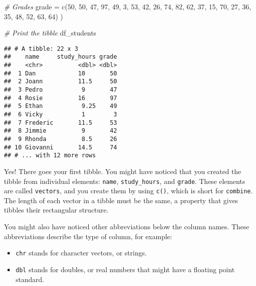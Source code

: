 \documentclass[
]{article}
\newenvironment{Shaded}{\begin{snugshade}}{\end{snugshade}}
\newcommand{\AttributeTok}[1]{\textcolor[rgb]{0.77,0.63,0.00}{#1}}
\newcommand{\CommentTok}[1]{\textcolor[rgb]{0.56,0.35,0.01}{\textit{#1}}}
\newcommand{\DecValTok}[1]{\textcolor[rgb]{0.00,0.00,0.81}{#1}}
\newcommand{\FunctionTok}[1]{\textcolor[rgb]{0.00,0.00,0.00}{#1}}
\newcommand{\NormalTok}[1]{#1}
\begin{document}
\begin{Shaded}
\begin{Highlighting}[]
  \CommentTok{\# Grades}
  \AttributeTok{grade =} \FunctionTok{c}\NormalTok{(}\DecValTok{50}\NormalTok{, }\DecValTok{50}\NormalTok{, }\DecValTok{47}\NormalTok{, }\DecValTok{97}\NormalTok{, }\DecValTok{49}\NormalTok{, }\DecValTok{3}\NormalTok{, }\DecValTok{53}\NormalTok{, }\DecValTok{42}\NormalTok{, }\DecValTok{26}\NormalTok{,}
             \DecValTok{74}\NormalTok{, }\DecValTok{82}\NormalTok{, }\DecValTok{62}\NormalTok{, }\DecValTok{37}\NormalTok{, }\DecValTok{15}\NormalTok{, }\DecValTok{70}\NormalTok{, }\DecValTok{27}\NormalTok{, }\DecValTok{36}\NormalTok{, }\DecValTok{35}\NormalTok{,}
             \DecValTok{48}\NormalTok{, }\DecValTok{52}\NormalTok{, }\DecValTok{63}\NormalTok{, }\DecValTok{64}\NormalTok{)}
\NormalTok{)}

\CommentTok{\# Print the tibble}
\NormalTok{df\_students}
\end{Highlighting}
\end{Shaded}

\begin{verbatim}
## # A tibble: 22 x 3
##    name     study_hours grade
##    <chr>          <dbl> <dbl>
##  1 Dan            10       50
##  2 Joann          11.5     50
##  3 Pedro           9       47
##  4 Rosie          16       97
##  5 Ethan           9.25    49
##  6 Vicky           1        3
##  7 Frederic       11.5     53
##  8 Jimmie          9       42
##  9 Rhonda          8.5     26
## 10 Giovanni       14.5     74
## # ... with 12 more rows
\end{verbatim}

Yes! There goes your first tibble. You might have noticed that you
created the tibble from individual elements: \texttt{name},
\texttt{study\_hours}, and \texttt{grade}. These elements are called
\texttt{vectors}, and you create them by using \texttt{c()}, which is
short for \texttt{combine}. The length of each vector in a tibble must
be the same, a property that gives tibbles their rectangular structure.

You might also have noticed other abbreviations below the column names.
These abbreviations describe the type of column, for example:

\begin{itemize}
\item
  \texttt{chr} stands for character vectors, or strings.
\item
  \texttt{dbl} stands for doubles, or real numbers that might have a
  floating point standard.
\end{itemize}
\end{document}
